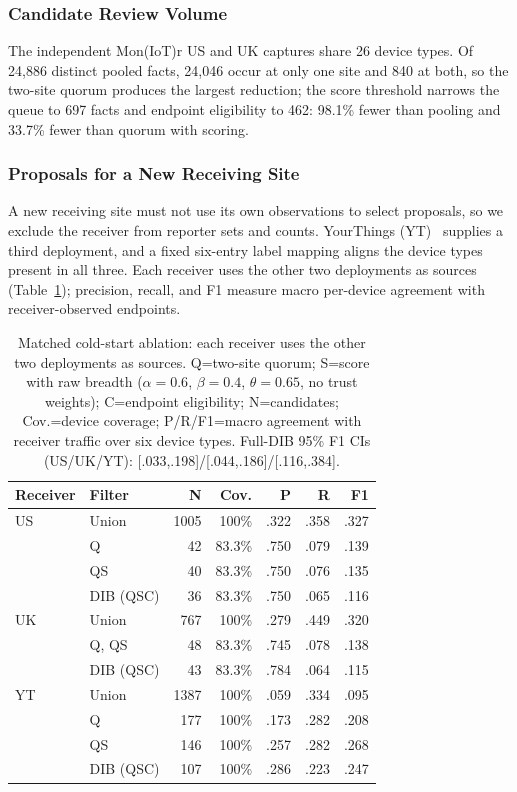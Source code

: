\documentclass[journal]{IEEEtran}
\theoremstyle{definition}
\begin{document}
\subsubsection{Candidate Review Volume}
\label{sec:workload-results}
The independent Mon(IoT)r US and UK captures share 26 device types. Of 24,886 distinct pooled facts, 24,046 occur at only one site and 840 at both, so the two-site quorum produces the largest reduction; the score threshold narrows the queue to 697 facts and endpoint eligibility to 462: 98.1\% fewer than pooling and 33.7\% fewer than quorum with scoring.

\subsubsection{Proposals for a New Receiving Site}
\label{sec:loo-results}
A new receiving site must not use its own observations to select proposals, so we exclude the receiver from reporter sets and counts. YourThings (YT)~\cite{alrawi2019yourthings} supplies a third deployment, and a fixed six-entry label mapping aligns the device types present in all three. Each receiver uses the other two deployments as sources (Table~\ref{tab:threelab}); precision, recall, and F1 measure macro per-device agreement with receiver-observed endpoints.

\begin{table}[t]
\centering
\caption{Matched cold-start ablation: each receiver uses the other two deployments as sources. Q=two-site quorum; S=score with raw breadth ($\alpha=0.6$, $\beta=0.4$, $\theta=0.65$, no trust weights); C=endpoint eligibility; N=candidates; Cov.=device coverage; P/R/F1=macro agreement with receiver traffic over six device types. Full-DIB 95\% F1 CIs (US/UK/YT): [.033,.198]/[.044,.186]/[.116,.384].}
\label{tab:threelab}
\scriptsize
\begin{tabular}{@{}llrrrrr@{}}
\toprule
Receiver & Filter & N & Cov. & P & R & F1 \\
\midrule
US & Union & 1005 & 100\% & .322 & .358 & .327 \\
 & Q & 42 & 83.3\% & .750 & .079 & .139 \\
 & QS & 40 & 83.3\% & .750 & .076 & .135 \\
 & DIB (QSC) & 36 & 83.3\% & .750 & .065 & .116 \\
\midrule
UK & Union & 767 & 100\% & .279 & .449 & .320 \\
 & Q, QS & 48 & 83.3\% & .745 & .078 & .138 \\
 & DIB (QSC) & 43 & 83.3\% & .784 & .064 & .115 \\
\midrule
YT & Union & 1387 & 100\% & .059 & .334 & .095 \\
 & Q & 177 & 100\% & .173 & .282 & .208 \\
 & QS & 146 & 100\% & .257 & .282 & .268 \\
 & DIB (QSC) & 107 & 100\% & .286 & .223 & .247 \\
\bottomrule
\end{tabular}
\end{table}
\end{document}

